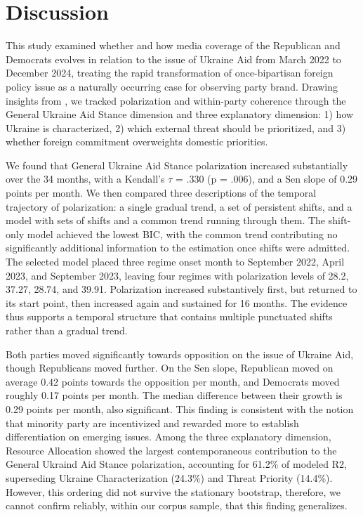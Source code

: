 \section{Discussion}


This study examined whether and how media coverage of the Republican and Democrats evolves in relation to the issue of Ukraine Aid from March 2022 to December 2024, treating the rapid transformation of once-bipartisan foreign policy issue as a naturally occurring case for observing party brand. Drawing insights from \citet{riegerTheyShouldntReceive2025}, we tracked polarization and within-party coherence through the General Ukraine Aid Stance dimension and three explanatory dimension: 1) how Ukraine is characterized, 2) which external threat should be prioritized, and 3) whether foreign commitment overweights domestic priorities.

We found that General Ukraine Aid Stance polarization increased substantially over the 34 months, with a Kendall's $\tau$ = .330 (p = .006), and a Sen slope of 0.29 points per month. We then compared three descriptions of the temporal trajectory of polarization: a single gradual trend, a set of persistent shifts, and a model with sets of shifts and a common trend running through them. The shift-only model achieved the lowest BIC, with the common trend contributing no significantly additional information to the estimation once shifts were admitted. The selected model placed three regime onset month to September 2022, April 2023, and September 2023, leaving four regimes with polarization levels of 28.2, 37.27, 28.74, and 39.91. Polarization increased substantively first, but returned to its start point, then increased again and sustained for 16 months. The evidence thus supports a temporal structure that contains multiple punctuated shifts rather than a gradual trend.

Both parties moved significantly towards opposition on the issue of Ukraine Aid, though Republicans moved further. On the Sen slope, Republican moved on average 0.42 points towards the opposition per month, and Democrats moved roughly 0.17 points per month. The median difference between their growth is 0.29 points per month, also significant. This finding is consistent with the notion that minority party are incentivized and rewarded more to establish differentiation on emerging issues. Among the three explanatory dimension, Resource Allocation showed the largest contemporaneous contribution to the General Ukraind Aid Stance polarization, accounting for 61.2\% of modeled R2, superseding Ukraine Characterization (24.3\%) and Threat Priority (14.4\%). However, this ordering did not survive the stationary bootstrap, therefore, we cannot confirm reliably, within our corpus sample, that this finding generalizes.

